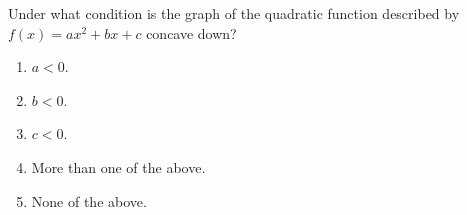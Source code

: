 \bigskip


\item Under what condition is the graph of the quadratic function described by $f(x) = ax^2 + bx + c$ concave down?

\begin{enumerate}
\item $a < 0$.
\item $b < 0$.
\item $c < 0$.
\item More than one of the above.
\item None of the above.
\end{enumerate}


